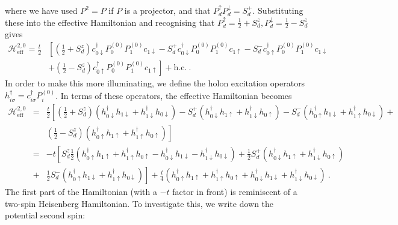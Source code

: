 \documentclass{iopart}
\begin{document}
where we have used \(P^2 = P\) if \(P\) is a projector, and that \(P_d^\uparrow P_d^ \downarrow = S_d^+\). Substituting these into the effective Hamiltonian and recognising that \(P_d^\uparrow = \frac{1}{2} + S_d^z, P_d^\downarrow = \frac{1}{2} - S_d^z\) gives
\begin{eqnarray}
	\mathcal{H}^{2, 0}_\text{eff} = \frac{t}{2}&\left[\left(\frac{1}{2} + S_d^z\right) c^\dagger_{0 \downarrow} P_0^{(0)} P_1^{(0)} c_{1 \downarrow} -S_d^+ c^\dagger_{0 \downarrow} P_0^{(0)} P_1^{(0)} c_{1 \uparrow} - S_d^- c^\dagger_{0 \uparrow} P_0^{(0)} P_1^{(0)} c_{1 \downarrow} \right. \nonumber\\
						   &\left.+ \left(\frac{1}{2} - S_d^z\right) c^\dagger_{0 \uparrow} P_0^{(0)} P_1^{(0)} c_{1 \uparrow} \right] + \text{h.c.}~.
\end{eqnarray}
In order to make this more illuminating, we define the holon excitation operators \(h^\dagger_{i\sigma} = c^\dagger_{i\sigma}P_i^{(0)}\). In terms of these operators, the effective Hamiltonian becomes
\begin{eqnarray}
	\mathcal{H}^{2, 0}_\text{eff} &=& \frac{t}{2}\left[\left(\frac{1}{2} + S_d^z\right) \left(h^\dagger_{0 \downarrow} h_{1 \downarrow} + h^\dagger_{1 \downarrow} h_{0 \downarrow}\right) - S_d^+ \left(h^\dagger_{0 \downarrow} h_{1 \uparrow} + h^\dagger_{1 \downarrow} h_{0 \uparrow}\right) - S_d^- \left(h^\dagger_{0 \uparrow} h_{1 \downarrow} + h^\dagger_{1 \uparrow} h_{0 \downarrow}\right) + \right. \nonumber\\
				      & & \left. \left(\frac{1}{2} - S_d^z\right) \left(h^\dagger_{0 \uparrow} h_{1 \uparrow}+ h^\dagger_{1 \uparrow} h_{0 \uparrow}\right) \right]\nonumber\\
				      &=& -t\left[S_d^z\frac{1}{2}\left(h^\dagger_{0 \uparrow} h_{1 \uparrow}+ h^\dagger_{1 \uparrow} h_{0 \uparrow} - h^\dagger_{0 \downarrow} h_{1 \downarrow} - h^\dagger_{1 \downarrow} h_{0 \downarrow}\right) + \frac{1}{2}S_d^+ \left(h^\dagger_{0 \downarrow} h_{1 \uparrow} + h^\dagger_{1 \downarrow} h_{0 \uparrow}\right) \right. \nonumber\\
				      &+& \left.\frac{1}{2}S_d^- \left(h^\dagger_{0 \uparrow} h_{1 \downarrow} + h^\dagger_{1 \uparrow} h_{0 \downarrow}\right) \right] + \frac{t}{4}\left(h^\dagger_{0 \uparrow} h_{1 \uparrow}+ h^\dagger_{1 \uparrow} h_{0 \uparrow} + h^\dagger_{0 \downarrow} h_{1 \downarrow} + h^\dagger_{1 \downarrow} h_{0 \downarrow}\right) \label{eff-ham-nfl}~.
\end{eqnarray}
The first part of the Hamiltonian (with a \(-t\) factor in front) is reminiscent of a two-spin Heisenberg Hamiltonian. To investigate this, we write down the potential second spin:
\end{document}
